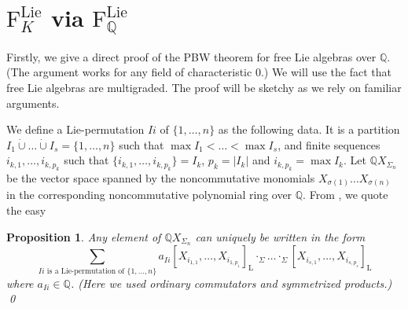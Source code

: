 \documentclass[11pt,a4paper]{amsart}
\newcommand{\plabel}[1]{ \label{#1}}
\newcommand{\plabel}[1]{ \label{#1}\rlap{\smash{${}^{^{[#1]}}$}}}
\newcommand{\plabel}[1]{ \label{#1}}
\DeclareMathOperator{\Lie}{Lie}
\theoremstyle{definition}
\theoremstyle{plain}
\newtheorem{prop}[point]{Proposition}
\begin{document}
\section{$\mathrm F_{K}^{\Lie}$ via $\mathrm F_{\mathbb Q}^{\Lie}$}\plabel{sec:via}
Firstly, we give a direct proof of the PBW theorem for  free Lie algebras over $\mathbb Q$.
(The argument works for any field of characteristic $0$.)
We will use the fact that free Lie algebras are multigraded. The proof will be sketchy as we rely on familiar arguments.

We define a  Lie-permutation $Ii$ of $\{1,\ldots,n\}$ as the following data.
It is a partition   $I_1\dot\cup\ldots \dot\cup I_s=\{1,\ldots,n\}$ such that $\max I_1<\ldots<\max I_s$,
 and finite sequences $i_{k,1},\ldots,i_{k,p_k}$ such that $\{i_{k,1},\ldots,i_{k,p_k}\}=I_k$, $p_k=|I_k|$ and $i_{k,p_k}=\max I_k$.
Let $\mathbb QX_{\Sigma_n}$ be the vector space spanned by the noncommutative monomials
 $X_{\sigma(1)}\ldots X_{\sigma(n)}$ in the corresponding noncommutative polynomial ring over $\mathbb Q$.
From \cite{LLX}, we quote the easy
\begin{prop}\plabel{prop:deco}
Any element of $\mathbb QX_{\Sigma_n}$ can uniquely be written in the form
\begin{equation}
\sum_{Ii\text{ is a Lie-permutation of }\{1,\ldots,n\}} a_{Ii}
[X_{i_{1,1}},\ldots,X_{i_{1,p_1}}]_{\mathrm L}\cdot_\Sigma\ldots \cdot_\Sigma [X_{i_{s,1}},\ldots,X_{i_{s,p_s}}]_{\mathrm L}
\plabel{eq:decoe}
\end{equation}
 where $a_{Ii}\in\mathbb Q$.
(Here we used ordinary commutators and symmetrized products.)
\qed
\end{prop}
\end{document}
